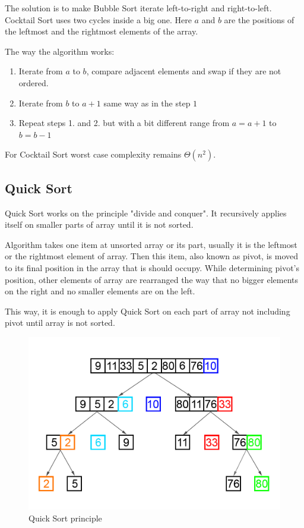 \documentclass[
  field=inf,
  biblatex,
  language=english,
  glossaries,
  theorems=false,
  sourcecodes=false,
  index
]{kidiplom}
\begin{document}
The solution is to make Bubble Sort iterate left-to-right and right-to-left. Cocktail Sort uses two cycles inside a big one. Here $a$ and $b$ are the positions of the leftmost and the rightmost elements of the array.

The way the algorithm works:

\begin{enumerate}
 \item Iterate from $a$ to $b$, compare adjacent elements and swap if they are not ordered.
 \item Iterate from $b$ to $a + 1$ same way as in the step $1$
 \item Repeat steps 1. and 2. but with a bit different range from $a = a + 1$ to $b = b - 1$
\end{enumerate}

For Cocktail Sort worst case complexity remains $\Theta(n^2)$.

\subsection{Quick Sort}
\label{sec:quicksort}
Quick Sort works on the principle "divide and conquer". It recursively applies itself on smaller parts of array until it is not sorted.

Algorithm takes one item at unsorted array or its part, usually it is the leftmost or the rightmost element of array. Then this item, also known as pivot, is moved to its final position in the array that is should occupy. While determining pivot's position, other elements of array are rearranged the way that no bigger elements on the right and no smaller elements are on the left.

This way, it is enough to apply Quick Sort on each part of array not including pivot until array is not sorted.

\begin{figure}[H]
\begin{center}
	
	\includegraphics[scale=0.35]{img/Quicksort.png}
	\caption{Quick Sort principle}\label{fig:insert}
\end{center}
\end{figure}
\end{document}
